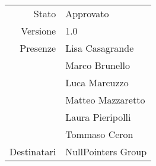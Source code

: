 \begin{center}
\begin{tabular}{r|l}
	Stato & Approvato \\
	Versione & 1.0 \\
	Presenze & Lisa Casagrande \\
	         & Marco Brunello \\
             & Luca Marcuzzo \\
	         & Matteo Mazzaretto \\
	         & Laura Pieripolli \\
	         & Tommaso Ceron \\
	Destinatari & NullPointers Group \\
\end{tabular}
\end{center}